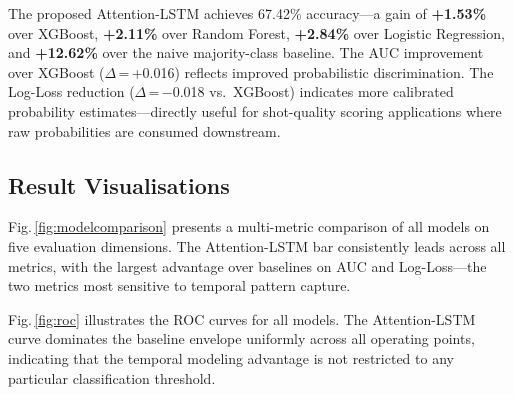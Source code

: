 \documentclass[conference]{IEEEtran}
\begin{document}
\begin{table}[htbp]
\centering
\caption{Model Performance Comparison (Temporal Test Set)}
\label{tab:results}
\renewcommand{\arraystretch}{1.4}
\setlength{\tabcolsep}{2pt}
\scriptsize
{}
\vspace{0.1cm}
\end{table}

The proposed Attention-LSTM achieves 67.42\% accuracy—a gain of
\textbf{+1.53\%} over XGBoost, \textbf{+2.11\%} over Random Forest,
\textbf{+2.84\%} over Logistic Regression, and \textbf{+12.62\%} over
the naive majority-class baseline.  The AUC improvement over XGBoost
($\Delta$\,=\,+0.016) reflects improved probabilistic discrimination.
The Log-Loss reduction ($\Delta$\,=\,$-$0.018 vs.\ XGBoost) indicates
more calibrated probability estimates—directly useful for shot-quality
scoring applications where raw probabilities are consumed downstream.

\subsection{Result Visualisations}

Fig.\,\ref{fig:modelcomparison} presents a multi-metric comparison of all
models on five evaluation dimensions.  The Attention-LSTM bar consistently
leads across all metrics, with the largest advantage over baselines on
AUC and Log-Loss—the two metrics most sensitive to temporal pattern
capture.

Fig.\,\ref{fig:roc} illustrates the ROC curves for all models.  The
Attention-LSTM curve dominates the baseline envelope uniformly across all
operating points, indicating that the temporal modeling advantage is not
restricted to any particular classification threshold.
\end{document}
